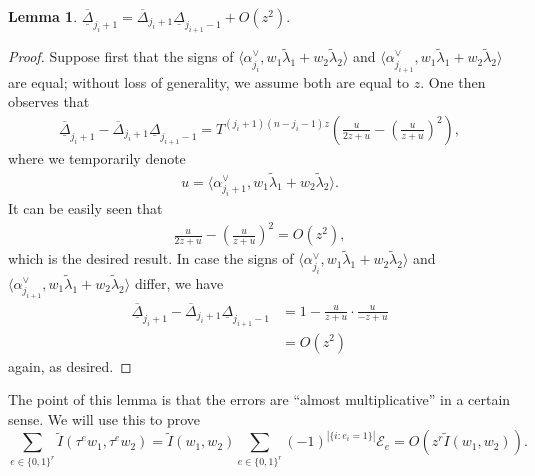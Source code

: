 \documentclass[11pt]{amsart}
\newtheorem{lemma}[theorem]{Lemma}
\numberwithin{theorem}{section}
\numberwithin{equation}{section}
\theoremstyle{remark}
\theoremstyle{definition}
\begin{document}
\begin{lemma} \label{lemma:approx_cancel}
$\underline{\overline{\Delta}}_{j_i+1} = \overline{\Delta}_{j_i+1}\underline{\Delta}_{j_{i+1}-1} + O(z^2).$
\end{lemma}
\begin{proof}
Suppose first that the signs of $\langle \alpha^\vee_{j_i},w_1\tilde\lambda_1+w_2\tilde\lambda_2\rangle$ and $\langle \alpha^\vee_{j_{i+1}},w_1\tilde\lambda_1+w_2\tilde\lambda_2\rangle$ are equal; without loss of generality, we assume both are equal to $z$.
One then observes that
\begin{align*}
\underline{\overline{\Delta}}_{j_i+1} - \overline{\Delta}_{j_i+1}\underline{\Delta}_{j_{i+1}-1} = T^{(j_i+1)(n-j_i-1)z}\left(\frac{u}{2z+u} - \left(\frac{u}{z+u}\right)^2\right),
\end{align*}
where we temporarily denote
\begin{align*}
u = \langle \alpha^\vee_{j_i+1},w_1\tilde\lambda_1+w_2\tilde\lambda_2\rangle.
\end{align*}
It can be easily seen that
\begin{align*}
\frac{u}{2z+u} - \left(\frac{u}{z+u}\right)^2= O(z^2),
\end{align*}
which is the desired result. In case the signs of $\langle \alpha^\vee_{j_i},w_1\tilde\lambda_1+w_2\tilde\lambda_2\rangle$ and $\langle \alpha^\vee_{j_{i+1}},w_1\tilde\lambda_1+w_2\tilde\lambda_2\rangle$ differ, we have
\begin{align*}
\underline{\overline{\Delta}}_{j_i+1} - \overline{\Delta}_{j_i+1}\underline{\Delta}_{j_{i+1}-1} &= 1-\frac{u}{z+u}\cdot\frac{u}{-z+u} \\
&=O(z^2)
\end{align*}
again, as desired.
\end{proof}

The point of this lemma is that the errors are ``almost multiplicative'' in a certain sense.
We will use this to prove
\begin{equation*}
\sum_{e\in\{0,1\}^r} \tilde I(\tau^ew_1,\tau^ew_2) = \tilde I(w_1,w_2)\sum_{e\in\{0,1\}^r} (-1)^{|\{i:e_i=1\}|} \mathcal E_e = O(z^r\tilde I(w_1,w_2)).
\end{equation*}
\end{document}
